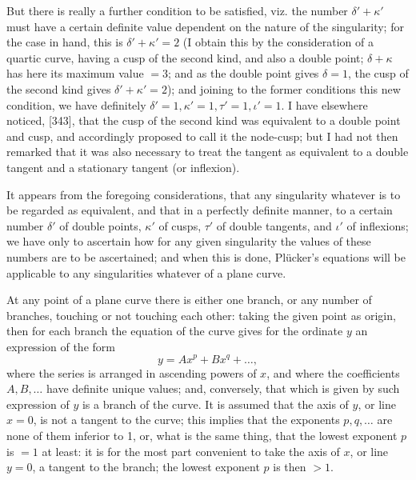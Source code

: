 \documentclass[11pt]{article}
\begin{document}
But there is really a further condition to be satisfied, viz. the number $\delta' + \kappa'$ must have a certain definite value dependent on the nature of the singularity; for the case in hand, this is $\delta' + \kappa' = 2$ (I obtain this by the consideration of a quartic curve, having a cusp of the second kind, and also a double point; $\delta + \kappa$ has here its maximum value $= 3$; and as the double point gives $\delta = 1$, the cusp of the second kind gives $\delta' + \kappa' = 2$); and joining to the former conditions this new condition, we have definitely $\delta' = 1, \kappa' = 1, \tau' = 1, \iota' = 1$. I have elsewhere noticed, [343], that the cusp of the second kind was equivalent to a double point and cusp, and accordingly proposed to call it the node-cusp; but I had not then remarked that it was also necessary to treat the tangent as equivalent to a double tangent and a stationary tangent (or inflexion).

It appears from the foregoing considerations, that any singularity whatever is to be regarded as equivalent, and that in a perfectly definite manner, to a certain number $\delta'$ of double points, $\kappa'$ of cusps, $\tau'$ of double tangents, and $\iota'$ of inflexions; we have only to ascertain how for any given singularity the values of these numbers are to be ascertained; and when this is done, Pl\"ucker's equations will be applicable to any singularities whatever of a plane curve.

At any point of a plane curve there is either one branch, or any number of branches, touching or not touching each other: taking the given point as origin, then for each branch the equation of the curve gives for the ordinate $y$ an expression of the form
\[ y = A x^p + B x^q + \ldots, \]
where the series is arranged in ascending powers of $x$, and where the coefficients $A, B,\ldots$ have definite unique values; and, conversely, that which is given by such expression of $y$ is a branch of the curve. It is assumed that the axis of $y$, or line $x = 0$, is not a tangent to the curve; this implies that the exponents $p, q,\ldots$ are none of them inferior to 1, or, what is the same thing, that the lowest exponent $p$ is $= 1$ at least: it is for the most part convenient to take the axis of $x$, or line $y = 0$, a tangent to the branch; the lowest exponent $p$ is then $> 1$.
\end{document}
